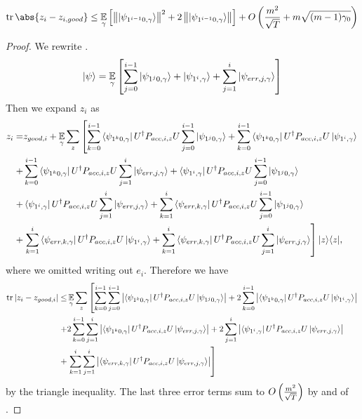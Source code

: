 \begin{theorem}
	$$\tr\abs{z_i-z_{i, good}}\leq\E_\gamma\L[\norm{\ket{\psi_{1^{i-1}0,\gamma}}}^2+ 2\norm{\ket{\psi_{1^{i-1}0,\gamma}}}\R]+O\L(\frac{m^2}{\sqrt T}+m\sqrt{(m-1)\gamma_0}\R)$$
\end{theorem}
\begin{proof}
	We rewrite .
	$$\ket{\psi}=\operatorname*{\mathbb{E}}_{\gamma}\left[
		\sum_{j=0}^{i-1} \ket{\psi_{1^j0,\gamma}} +\ket{\psi_{1^i,\gamma}} +\sum_{j=1}^{i}\ket{\psi_{err,j,\gamma}}
	\right]$$
	Then we expand $z_i$ as
	\begin{align}
		z_i=& z_{good,i}+ \operatorname*{\mathbb{E}}_\gamma \sum_z \left[\sum_{k=0}^{i-1} \bra{\psi_{1^k0,\gamma}}U^\dag  P_{acc,i,z}U   \sum_{j=0}^{i-1} \ket{\psi_{1^j0,\gamma}}+
		\sum_{k=0}^{i-1} \bra{\psi_{1^k0,\gamma}}U^\dag  P_{acc,i,z}U \ket{\psi_{1^i,\gamma}}  \right. \nonumber \\
		+&  \sum_{k=0}^{i-1} \bra{\psi_{1^k0,\gamma}}U^\dag  P_{acc,i,z}U\sum_{j=1}^{i}\ket{\psi_{err,j,\gamma}}
		+\bra{\psi_{1^i,\gamma}} U^\dag  P_{acc,i,z}U \sum_{j=0}^{i-1} \ket{\psi_{1^j0,\gamma}}
		\nonumber \\
		+&  \bra{\psi_{1^i,\gamma}} U^\dag  P_{acc,i,z}U \sum_{j=1}^{i}\ket{\psi_{err,j,\gamma}}
		+\sum_{k=1}^{i}\bra{\psi_{err,k,\gamma}} U^\dag  P_{acc,i,z}U  \sum_{j=0}^{i-1} \ket{\psi_{1^j0,\gamma}}
		\nonumber \\
		+&\left.   \sum_{k=1}^{i}\bra{\psi_{err,k,\gamma}} U^\dag  P_{acc,i,z}U \ket{\psi_{1^i,\gamma}} +\sum_{k=1}^{i}\bra{\psi_{err,k,\gamma}} U^\dag  P_{acc,i,z}U \sum_{j=1}^{i}\ket{\psi_{err,j,\gamma}} \right] |z\rangle\langle z| , \nonumber     
	\end{align}
	where we omitted writing out $e_i$.
	Therefore we have
	\begin{align*}
		\tr|z_i-z_{good,i}|\leq& \E_\gamma \sum_z \L[ \sum_{k=0}^{i-1} \sum_{j=0}^{i-1} \L| \bra{\psi_{1^k0,\gamma}}U^\dag  P_{acc,i,z}U \ket{\psi_{1^j0,\gamma}} \R|+
		2 \sum_{k=0}^{i-1} \L|\bra{\psi_{1^k0,\gamma}}U^\dag  P_{acc,i,z}U \ket{\psi_{1^i,\gamma}} \R|  \R. \\
		+& 2 \sum_{k=0}^{i-1}\sum_{j=1}^{i}\L| \bra{\psi_{1^k0,\gamma}}U^\dag  P_{acc,i,z}U\ket{\psi_{err,j,\gamma}}\R|    
		+2 \sum_{j=1}^{i}\L|\bra{\psi_{1^i,\gamma}} U^\dag  P_{acc,i,z}U \ket{\psi_{err,j,\gamma}}\R| \\
		+&\L. \sum_{k=1}^{i}\sum_{j=1}^{i}\L| \bra{\psi_{err,k,\gamma}} U^\dag  P_{acc,i,z}U \ket{\psi_{err,j,\gamma}}\R| \R] \\ %
	\end{align*}
	by the triangle inequality.
	The last three error terms sum to $O\left(\frac{m^2}{\sqrt{T}}\right)$ by  and  of .


\end{proof}
